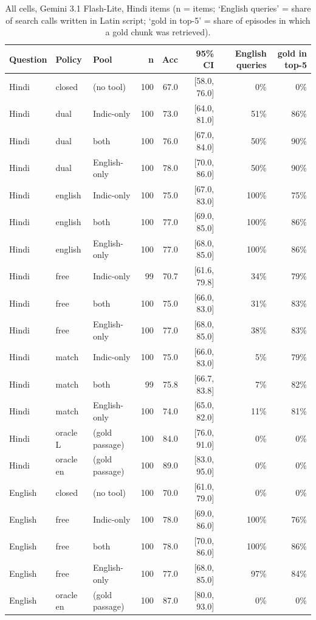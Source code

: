 \begin{table}[htbp]\centering\scriptsize
\begin{tabular}{lllrrrrr}
\toprule
Question & Policy & Pool & n & Acc & 95\% CI & English queries & gold in top-5 \\
\midrule
Hindi & closed & (no tool) & 100 & 67.0 & [58.0, 76.0] & 0\% & 0\% \\
Hindi & dual & Indic-only & 100 & 73.0 & [64.0, 81.0] & 51\% & 86\% \\
Hindi & dual & both & 100 & 76.0 & [67.0, 84.0] & 50\% & 90\% \\
Hindi & dual & English-only & 100 & 78.0 & [70.0, 86.0] & 50\% & 90\% \\
Hindi & english & Indic-only & 100 & 75.0 & [67.0, 83.0] & 100\% & 75\% \\
Hindi & english & both & 100 & 77.0 & [69.0, 85.0] & 100\% & 86\% \\
Hindi & english & English-only & 100 & 77.0 & [68.0, 85.0] & 100\% & 86\% \\
Hindi & free & Indic-only & 99 & 70.7 & [61.6, 79.8] & 34\% & 79\% \\
Hindi & free & both & 100 & 75.0 & [66.0, 83.0] & 31\% & 83\% \\
Hindi & free & English-only & 100 & 77.0 & [68.0, 85.0] & 38\% & 83\% \\
Hindi & match & Indic-only & 100 & 75.0 & [66.0, 83.0] & 5\% & 79\% \\
Hindi & match & both & 99 & 75.8 & [66.7, 83.8] & 7\% & 82\% \\
Hindi & match & English-only & 100 & 74.0 & [65.0, 82.0] & 11\% & 81\% \\
Hindi & oracle L & (gold passage) & 100 & 84.0 & [76.0, 91.0] & 0\% & 0\% \\
Hindi & oracle en & (gold passage) & 100 & 89.0 & [83.0, 95.0] & 0\% & 0\% \\
English & closed & (no tool) & 100 & 70.0 & [61.0, 79.0] & 0\% & 0\% \\
English & free & Indic-only & 100 & 78.0 & [69.0, 86.0] & 100\% & 76\% \\
English & free & both & 100 & 78.0 & [70.0, 86.0] & 100\% & 86\% \\
English & free & English-only & 100 & 77.0 & [68.0, 85.0] & 97\% & 84\% \\
English & oracle en & (gold passage) & 100 & 87.0 & [80.0, 93.0] & 0\% & 0\% \\
\bottomrule
\end{tabular}
\caption{All cells, Gemini 3.1 Flash-Lite, Hindi items (n = items; `English queries' = share of search calls written in Latin script; `gold in top-5' = share of episodes in which a gold chunk was retrieved).}
\end{table}

